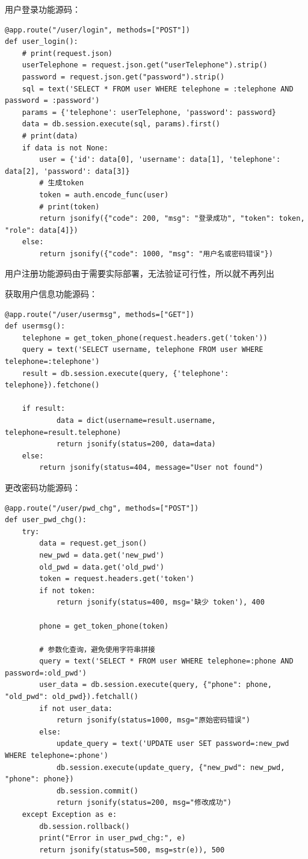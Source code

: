 \documentclass[a4paper,AutoFakeBold={2.7}]{ctexart} %
\begin{document}
用户登录功能源码：
\begin{lstlisting}
@app.route("/user/login", methods=["POST"])
def user_login():
    # print(request.json)
    userTelephone = request.json.get("userTelephone").strip()
    password = request.json.get("password").strip()
    sql = text('SELECT * FROM user WHERE telephone = :telephone AND password = :password')
    params = {'telephone': userTelephone, 'password': password}
    data = db.session.execute(sql, params).first()
    # print(data)
    if data is not None:
        user = {'id': data[0], 'username': data[1], 'telephone': data[2], 'password': data[3]}
        # 生成token
        token = auth.encode_func(user)
        # print(token)
        return jsonify({"code": 200, "msg": "登录成功", "token": token, "role": data[4]})
    else:
        return jsonify({"code": 1000, "msg": "用户名或密码错误"})
\end{lstlisting}

用户注册功能源码由于需要实际部署，无法验证可行性，所以就不再列出

获取用户信息功能源码：
\begin{lstlisting}
@app.route("/user/usermsg", methods=["GET"])
def usermsg():
    telephone = get_token_phone(request.headers.get('token'))
    query = text('SELECT username, telephone FROM user WHERE telephone=:telephone')
    result = db.session.execute(query, {'telephone': telephone}).fetchone()

    if result:
            data = dict(username=result.username, telephone=result.telephone)
            return jsonify(status=200, data=data)
    else:
        return jsonify(status=404, message="User not found")
\end{lstlisting}

更改密码功能源码：
\begin{lstlisting}
@app.route("/user/pwd_chg", methods=["POST"])
def user_pwd_chg():
    try:
        data = request.get_json()
        new_pwd = data.get('new_pwd')
        old_pwd = data.get('old_pwd')
        token = request.headers.get('token')
        if not token:
            return jsonify(status=400, msg='缺少 token'), 400

        phone = get_token_phone(token)

        # 参数化查询，避免使用字符串拼接
        query = text('SELECT * FROM user WHERE telephone=:phone AND password=:old_pwd')
        user_data = db.session.execute(query, {"phone": phone, "old_pwd": old_pwd}).fetchall()
        if not user_data:
            return jsonify(status=1000, msg="原始密码错误")
        else:
            update_query = text('UPDATE user SET password=:new_pwd WHERE telephone=:phone')
            db.session.execute(update_query, {"new_pwd": new_pwd, "phone": phone})
            db.session.commit()
            return jsonify(status=200, msg="修改成功")
    except Exception as e:
        db.session.rollback()
        print("Error in user_pwd_chg:", e)
        return jsonify(status=500, msg=str(e)), 500
\end{lstlisting}
\end{document}

